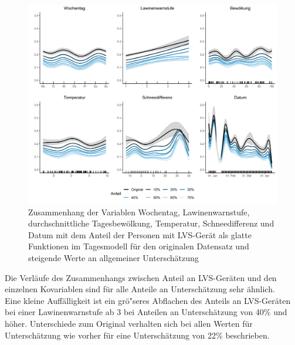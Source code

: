 \documentclass[12pt]{scrreprt}
\begin{document}
\begin{figure}[H]
	\centering
	\includegraphics[width=\linewidth]{plots/day_model_general_comparison}
	\caption{Zusammenhang der Variablen Wochentag, Lawinenwarnstufe, durchschnittliche Tagesbewölkung, Temperatur, Schneedifferenz und Datum mit dem Anteil der Personen mit LVS-Gerät als glatte Funktionen im Tagesmodell für den originalen Datensatz und steigende Werte an allgemeiner Unterschätzung}
	\label{pic:day_model_general_comparison}	
\end{figure}

\noindent Die Verläufe des Zusammenhangs zwischen Anteil an LVS-Geräten und den einzelnen Kovariablen sind für alle Anteile an Unterschätzung sehr ähnlich. \\
Eine kleine Auffälligkeit ist ein grö"seres Abflachen des Anteils an LVS-Geräten bei einer Lawinenwarnstufe ab 3 bei Anteilen an Unterschätzung von 40\% und höher. Unterschiede zum Original verhalten sich bei allen Werten für Unterschätzung wie vorher für eine Unterschätzung von 22\% beschrieben.
\end{document}
